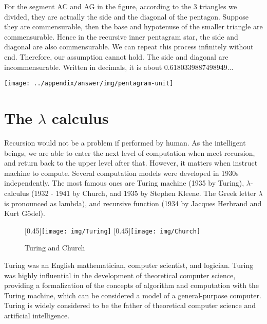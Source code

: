 \documentclass[b5paper]{article}
\begin{document}
\begin{Answer}[ref={ex:euclid-algorithm}]
{For the segment AC and AG in the figure, according to the 3 triangles we divided, they are actually the side and the diagonal of the pentagon. Suppose they are commensurable, then the base and hypotenuse of the smaller triangle are commensurable. Hence in the recursive inner pentagram star, the side and diagonal are also commensurable. We can repeat this process infinitely without end. Therefore, our assumption cannot hold. The side and diagonal are incommensurable. Written in decimals, it is about 0.6180339887498949...

\begin{center}
 \texttt{[image: ../appendix/answer/img/pentagram-unit]}
 \label{fig:pentagram-unit}
\end{center}
}
\end{Answer}

\section{The \texorpdfstring{$\lambda$}{λ} calculus}

Recursion would not be a problem if performed by human. As the intelligent beings, we are able to enter the next level of computation when meet recursion, and return back to the upper level after that. However, it matters when instruct machine to compute. Several computation models were developed in 1930s independently. The most famous ones are Turing machine (1935 by Turing), $\lambda$-calculus (1932 - 1941 by Church, and 1935 by Stephen Kleene. The Greek letter $\lambda$ is pronounced as lambda), and recursive function (1934 by Jacques Herbrand and Kurt Gödel).

\begin{figure}[htbp]
 \centering
 [0.45\linewidth]{\texttt{[image: img/Turing]}} \quad
 [0.45\linewidth]{\texttt{[image: img/Church]}}
 \caption{Turing and Church}
 \label{fig:Turing}
 \label{fig:Church}
\end{figure}

Turing was an English mathematician, computer scientist, and logician. Turing was highly influential in the development of theoretical computer science, providing a formalization of the concepts of algorithm and computation with the Turing machine, which can be considered a model of a general-purpose computer. Turing is widely considered to be the father of theoretical computer science and artificial intelligence\cite{wiki-Turing}.
\end{document}

